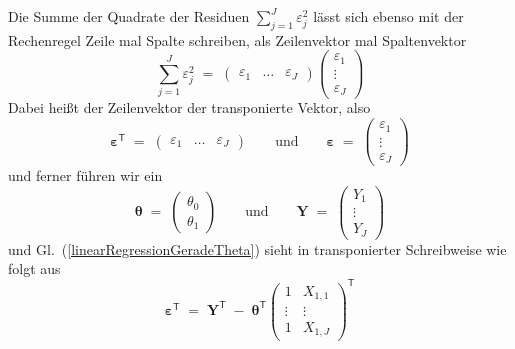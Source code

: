 Die Summe der Quadrate der Residuen $\sum_{j=1}^J \varepsilon_j^2$ lässt sich ebenso
mit der Rechenregel Zeile mal Spalte schreiben, als Zeilenvektor mal Spaltenvektor
\begin{equation}
\sum_{j=1}^J \varepsilon_j^2 \; = \;
\left(\begin{array}{ccc}
\varepsilon_1 & \dots & \varepsilon_J
\end{array}
\right)
\left(
\begin{array}{c}
\varepsilon_1\\
\vdots \\
\varepsilon_J
\end{array}
\right)
\end{equation}
Dabei heißt der Zeilenvektor der transponierte Vektor, also
\begin{equation}
\boldsymbol{\varepsilon}^\mathsf{T} \; = \; \left(\begin{array}{ccc}
\varepsilon_1 & \dots & \varepsilon_J
\end{array}
\right) \qquad \mathrm{und}  \qquad
\boldsymbol{\varepsilon} \; = \; \left(
\begin{array}{c}
\varepsilon_1\\
\vdots \\
\varepsilon_J
\end{array}
\right)
\end{equation}
und ferner führen wir ein
\begin{equation}
\boldsymbol{\theta} \; = \;
\left(
\begin{array}{c}
\theta_0\\
\theta_1
\end{array}
\right) \qquad \mathrm{und}  \qquad
\mathbf{Y}  \; = \;\left(
\begin{array}{c}
Y_{1}\\
\vdots \\
Y_{J}
\end{array}
\right)
\end{equation}
und Gl.~(\ref{linearRegressionGeradeTheta}) sieht in transponierter Schreibweise
wie folgt aus
\begin{equation}
\boldsymbol{\varepsilon}^\mathsf{T} \; = \;
\mathbf{Y}^\mathsf{T}
\; - \;
\boldsymbol{\theta}^\mathsf{T} \left(
\begin{array}{cc}
1 &  X_{1,1} \\
\vdots & \vdots\\
1 & X_{1,J}
\end{array}
\right)^\mathsf{T}
\label{linearRegressionGeradeTransponiert}
\end{equation}
